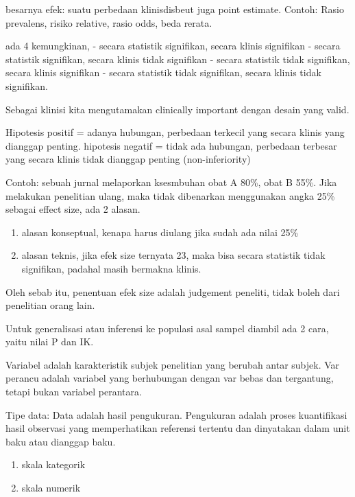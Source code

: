 \documentclass[
  letterpaper,
  DIV=11,
  numbers=noendperiod]{scrreprt}
\providecommand{\tightlist}{%
  \setlength{\itemsep}{0pt}\setlength{\parskip}{0pt}}\usepackage{longtable,booktabs,array}
\begin{document}
besarnya efek: suatu perbedaan klinisdisbeut juga point estimate.
Contoh: Rasio prevalens, risiko relative, rasio odds, beda rerata.

ada 4 kemungkinan, - secara statistik signifikan, secara klinis
signifikan - secara statistik signifikan, secara klinis tidak signifikan
- secara statistik tidak signifikan, secara klinis signifikan - secara
statistik tidak signifikan, secara klinis tidak signifikan.

Sebagai klinisi kita mengutamakan clinically important dengan desain
yang valid.

Hipotesis positif = adanya hubungan, perbedaan terkecil yang secara
klinis yang dianggap penting. hipotesis negatif = tidak ada hubungan,
perbedaan terbesar yang secara klinis tidak dianggap penting
(non-inferiority)

Contoh: sebuah jurnal melaporkan ksesmbuhan obat A 80\%, obat B 55\%.
Jika melakukan penelitian ulang, maka tidak dibenarkan menggunakan angka
25\% sebagai effect size, ada 2 alasan.

\begin{enumerate}
\def\labelenumi{\arabic{enumi}.}
\tightlist
\item
  alasan konseptual, kenapa harus diulang jika sudah ada nilai 25\%
\item
  alasan teknis, jika efek size ternyata 23, maka bisa secara statistik
  tidak signifikan, padahal masih bermakna klinis.
\end{enumerate}

Oleh sebab itu, penentuan efek size adalah judgement peneliti, tidak
boleh dari penelitian orang lain.

Untuk generalisasi atau inferensi ke populasi asal sampel diambil ada 2
cara, yaitu nilai P dan IK.

Variabel adalah karakteristik subjek penelitian yang berubah antar
subjek. Var perancu adalah variabel yang berhubungan dengan var bebas
dan tergantung, tetapi bukan variabel perantara.

Tipe data: Data adalah hasil pengukuran. Pengukuran adalah proses
kuantifikasi hasil observasi yang memperhatikan referensi tertentu dan
dinyatakan dalam unit baku atau dianggap baku.

\begin{enumerate}
\def\labelenumi{\arabic{enumi}.}
\tightlist
\item
  skala kategorik
\item
  skala numerik
\end{enumerate}
\end{document}
